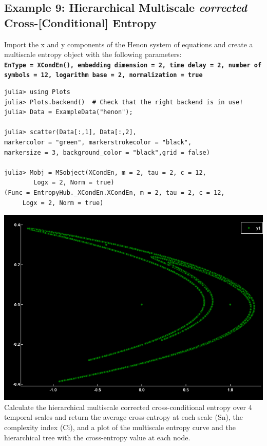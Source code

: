 \documentclass[12pt, a4paper, titlepage, openany]{book}
\begin{document}
\newpage
\subsection{\normalsize Example 9: \hspace{15mm} Hierarchical Multiscale \emph{corrected} Cross-[Conditional] Entropy}
\noindent Import the x and y components of the Henon system of equations and create a multiscale entropy object with the following parameters:\\
\texttt{\textbf{EnType =  XCondEn(), embedding dimension = 2, time delay = 2, number of symbols = 12, logarithm base = 2, normalization = true}}
\begin{verbatim}
julia> using Plots
julia> Plots.backend()  # Check that the right backend is in use! 
julia> Data = ExampleData("henon");

julia> scatter(Data[:,1], Data[:,2], 
markercolor = "green", markerstrokecolor = "black",
markersize = 3, background_color = "black",grid = false)

julia> Mobj = MSobject(XCondEn, m = 2, tau = 2, c = 12, 
		Logx = 2, Norm = true)
(Func = EntropyHub._XCondEn.XCondEn, m = 2, tau = 2, c = 12,
	 Logx = 2, Norm = true)
\end{verbatim}
\includegraphics[scale=.5]{henonjl.png}\newline \newline
Calculate the hierarchical multiscale corrected cross-conditional entropy over 4 temporal scales and return the average cross-entropy at each scale (Sn), the complexity index (Ci), and a plot of the multiscale entropy curve and the hierarchical tree with the cross-entropy value at each node.
\end{document}
